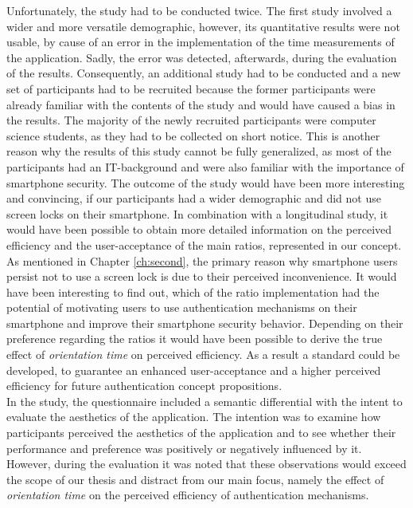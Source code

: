 Unfortunately, the study had to be conducted twice. The first study involved a wider and more versatile demographic, however, its quantitative results were not usable, by cause of an error in the implementation of the time measurements of the application. Sadly, the error was detected, afterwards, during the evaluation of the results. Consequently, an additional study had to be conducted and a new set of participants had to be recruited because the former participants were already familiar with the contents of the study and would have caused a bias in the results. The majority of the newly recruited participants were computer science students, as they had to be collected on short notice. This is another reason why the results of this study cannot be fully generalized, as most of the participants had an IT-background and were also familiar with the importance of smartphone security. The outcome of the study would have been more interesting and convincing, if our participants had a wider demographic and did not use screen locks on their smartphone. In combination with a longitudinal study, it would have been possible to obtain more detailed information on the perceived efficiency and the user-acceptance of the main ratios, represented in our concept. As mentioned in Chapter \ref{ch:second}, the primary reason why smartphone users persist not to use a screen lock is due to their perceived inconvenience. It would have been interesting to find out, which of the ratio implementation had the potential of motivating users to use authentication mechanisms on their smartphone and improve their smartphone security behavior. Depending on their preference regarding the ratios it would have been possible to derive the true effect of \textit{orientation time} on perceived efficiency. As a result a standard could be developed, to guarantee an enhanced user-acceptance and a higher perceived efficiency for future authentication concept propositions. \\

In the study, the questionnaire included a semantic differential with the intent to evaluate the aesthetics of the application. The intention was to examine how participants perceived the aesthetics of the application and to see whether their performance and preference was positively or negatively influenced by it. However, during the evaluation it was noted that these observations would exceed the scope of our thesis and distract from our main focus, namely the effect of \textit{orientation time} on the perceived efficiency of authentication mechanisms.\\

